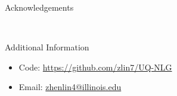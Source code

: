 





\begin{block}{Acknowledgements}

\small{} \\

\end{block}



\begin{alertblock}{Additional Information}

\begin{itemize}
\item Code: \href{https://github.com/zlin7/UQ-NLG}{https://github.com/zlin7/UQ-NLG}
\item Email: \href{mailto:zhenlin4@illinois.edu}{zhenlin4@illinois.edu}
\end{itemize}

\end{alertblock}